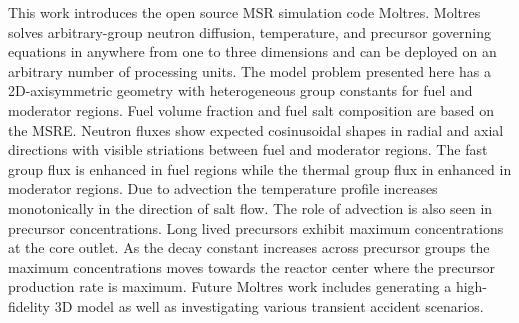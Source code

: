 \documentclass{article}
\begin{document}
This work introduces the open source \gls{MSR} simulation code Moltres. Moltres
solves arbitrary-group neutron diffusion, temperature, and precursor governing
equations in anywhere from one to three dimensions and can be deployed on an
arbitrary number of processing units. The model problem presented here has a
2D-axisymmetric geometry with heterogeneous group constants for fuel and
moderator regions. Fuel volume fraction and fuel salt composition are based on
the \gls{MSRE}. Neutron fluxes show expected cosinusoidal shapes in radial and
axial directions with visible striations between fuel and moderator regions. The
fast group flux is enhanced in fuel regions while the thermal group flux in
enhanced in moderator regions. Due to advection the temperature profile
increases monotonically in the direction of salt flow. The role of advection is
also seen in precursor concentrations. Long lived precursors exhibit maximum
concentrations at the core outlet. As the decay constant increases across
precursor groups the maximum concentrations moves towards the reactor center
where the precursor production rate is maximum. Future Moltres work includes
generating a high-fidelity 3D model as well as investigating various transient
accident scenarios.

\FloatBarrier
\clearpage
\printglossary[type=\acronymtype]


\end{document}
